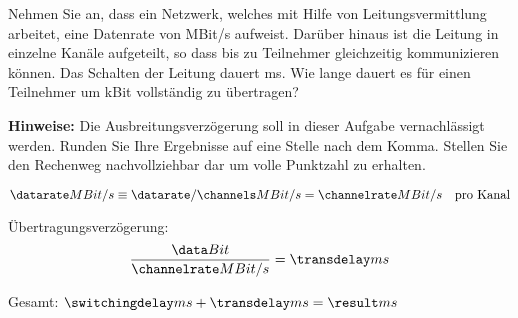 
\question[5]

Nehmen Sie an, dass ein Netzwerk, welches mit Hilfe von Leitungsvermittlung
arbeitet, eine Datenrate von \datarate MBit/s aufweist. Darüber hinaus ist die
Leitung in \channels{} einzelne Kanäle aufgeteilt, so dass bis zu \channels{}
Teilnehmer gleichzeitig kommunizieren können.  Das Schalten der Leitung dauert
\switchingdelay ms. Wie lange dauert es für einen Teilnehmer um \data kBit
vollständig zu übertragen?

\textbf{Hinweise:} Die Ausbreitungsverzögerung soll in dieser Aufgabe vernachlässigt werden. Runden Sie Ihre Ergebnisse auf eine Stelle nach dem Komma. Stellen Sie den
Rechenweg nachvollziehbar dar um volle Punktzahl zu erhalten.

\begin{solutionbox}{5cm}
	\[
	\datarate MBit/s \equiv \datarate/\channels MBit/s = \channelrate MBit/s \quad\textrm{pro Kanal}
	\]

	Übertragungsverzögerung:
	\[ \frac{\data Bit}{\channelrate MBit/s} = \transdelay ms\]

	Gesamt: $\switchingdelay ms + \transdelay ms = \result ms$
\end{solutionbox}
